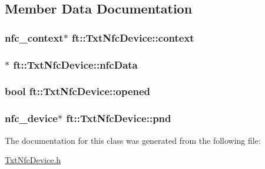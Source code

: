 \subsection{Member Data Documentation}
\subsubsection[{\texorpdfstring{context}{context}}]{\setlength{\rightskip}{0pt plus 5cm}nfc\+\_\+context$\ast$ ft\+::\+Txt\+Nfc\+Device\+::context\hspace{0.3cm}{\ttfamily [protected]}}\hypertarget{classft_1_1_txt_nfc_device_a38f93ed8b4c00b8d25903f93bdcfb309}{}\label{classft_1_1_txt_nfc_device_a38f93ed8b4c00b8d25903f93bdcfb309}
\subsubsection[{\texorpdfstring{nfc\+Data}{nfcData}}]{$\ast$ ft\+::\+Txt\+Nfc\+Device\+::nfc\+Data\hspace{0.3cm}{\ttfamily [protected]}}\hypertarget{classft_1_1_txt_nfc_device_ab5b73197e3759749a26d0a73b7fb07a3}{}\label{classft_1_1_txt_nfc_device_ab5b73197e3759749a26d0a73b7fb07a3}
\subsubsection[{\texorpdfstring{opened}{opened}}]{\setlength{\rightskip}{0pt plus 5cm}bool ft\+::\+Txt\+Nfc\+Device\+::opened\hspace{0.3cm}{\ttfamily [protected]}}\hypertarget{classft_1_1_txt_nfc_device_a41320e73fee7719850232c9c276f26b1}{}\label{classft_1_1_txt_nfc_device_a41320e73fee7719850232c9c276f26b1}
\subsubsection[{\texorpdfstring{pnd}{pnd}}]{\setlength{\rightskip}{0pt plus 5cm}nfc\+\_\+device$\ast$ ft\+::\+Txt\+Nfc\+Device\+::pnd\hspace{0.3cm}{\ttfamily [protected]}}\hypertarget{classft_1_1_txt_nfc_device_a59bf44e5cdecb9619cb151ac0dbdd4c4}{}\label{classft_1_1_txt_nfc_device_a59bf44e5cdecb9619cb151ac0dbdd4c4}


The documentation for this class was generated from the following file\+:\begin{DoxyCompactItemize}
\item 
\hyperlink{_txt_nfc_device_8h}{Txt\+Nfc\+Device.\+h}\end{DoxyCompactItemize}
